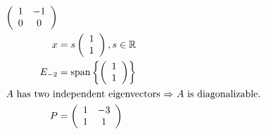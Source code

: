 \documentclass[12pt]{article}
\begin{document}
\begin{align*}
\left( \begin{array}{cc}
1 & -1\\
0 & 0\\
\end{array} \right)\\
x &= 
s\left( \begin{array}{c}
1\\
1\\
\end{array} \right) , s \in \mathbb{R}\\
E_{-2} &= \text{span}\left\{
\left( \begin{array}{c}
1\\
1\\
\end{array} \right) \right\} \\
\intertext{$A$ has two independent eigenvectors $\Rightarrow$ $A$ is diagonalizable.}
P &= 
\left( \begin{array}{cc}
1 & -3\\
1 & 1\\
\end{array} \right)\\
\end{align*}
\filbreak
\end{document}
